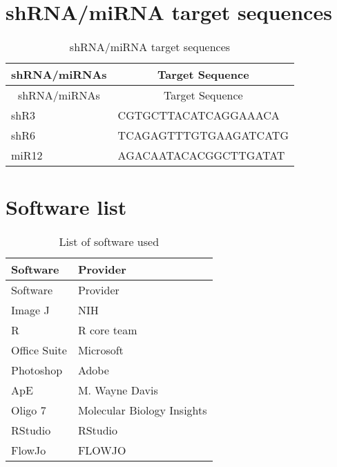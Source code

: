 \section{shRNA/miRNA target sequences}

\begin{longtable}{ll}
\caption[shRNA/miRNA target sequences]{shRNA/miRNA target sequences}\label{tab:tab7}\tabularnewline
\toprule 
\multicolumn{1}{c}{shRNA/miRNAs}&\multicolumn{1}{c}{Target Sequence}\tabularnewline
\midrule
\endfirsthead

\multicolumn{1}{c}{shRNA/miRNAs}&\multicolumn{1}{c}{Target Sequence}\tabularnewline
\midrule
\endhead
\hline
\endfoot
shR3&CGTGCTTACATCAGGAAACA\tabularnewline
shR6&TCAGAGTTTGTGAAGATCATG\tabularnewline
miR12&AGACAATACACGGCTTGATAT\tabularnewline
\bottomrule
\end{longtable}

\section{Software list}
\begin{longtable}{ll}
\caption[Software list]{List of software used}\label{tab:tab6}\tabularnewline
\toprule 
\multicolumn{1}{l}{Software}&\multicolumn{1}{l}{Provider}\tabularnewline
\midrule
\endfirsthead

\multicolumn{1}{l}{Software}&\multicolumn{1}{l}{Provider}\tabularnewline
\midrule
\endhead
\hline
\endfoot
Image J&NIH\tabularnewline
R&R core team\tabularnewline
Office Suite&Microsoft\tabularnewline
Photoshop&Adobe\tabularnewline
ApE&M. Wayne Davis\tabularnewline
Oligo 7&Molecular Biology Insights\tabularnewline
RStudio&RStudio\tabularnewline
FlowJo&FLOWJO\tabularnewline
\bottomrule
\end{longtable}




